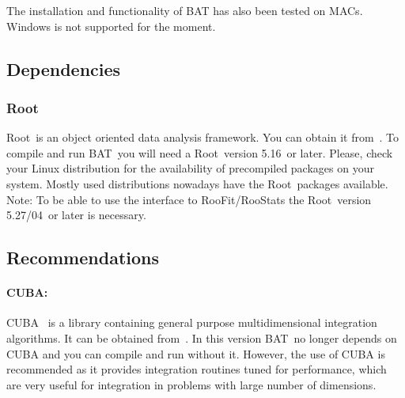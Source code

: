 \documentclass[11pt, a4paper]{article}
\newcommand{\bat}{{\sc BAT}}
\newcommand{\Root}{{\sc Root}}
\newcommand{\RootVersion}{5.16}
\newcommand{\RooStatsVersion}{5.27/04}
\begin{document}
\noindent
The installation and functionality of BAT has also been tested on MACs. \\

\noindent
Windows is not supported for the moment.


\subsection{Dependencies}

\subsubsection{\Root}
\Root\ is an object oriented data analysis framework. You can obtain it
from~\cite{ROOTweb}. To compile and run \bat\ you will need a \Root\
version \RootVersion\ or later. Please, check your Linux distribution for the
availability of precompiled packages on your system. Mostly used
distributions nowadays have the \Root\ packages available. \\

\noindent
Note: To be able to use the interface to RooFit/RooStats the \Root\
version \RooStatsVersion\ or later is necessary.


\subsection{Recommendations}

\enlargethispage{1cm}

\paragraph{CUBA:}
CUBA~\cite{CUBA} is a library containing general purpose
multidimensional integration algorithms. It can be obtained
from~\cite{CUBAweb}. In this version \bat\ no longer depends on CUBA
and you can compile and run without it. However, the use of CUBA is
recommended as it provides integration routines tuned for performance,
which are very useful for integration in problems with large number
of dimensions. \\
\end{document}
